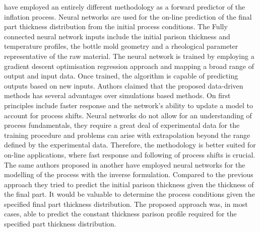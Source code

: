 \citep{diraddo1993line} have employed an entirely different methodology as a forward predictor of the inflation process. Neural networks are used for the on-line prediction of the final part thickness distribution from the initial process conditions. The Fully connected neural network inputs include the initial parison thickness and temperature profiles, the bottle mold geometry and a rheological parameter representative of the raw material. The neural network is trained by employing a gradient descent optimisation regression approach and mapping a broad range of output and input data. Once trained, the algorithm is capable of predicting outputs based on new inputs. Authors claimed that the proposed data-driven methods has several advantages over simulations based methods. On first principles include faster response and the network’s ability to update a model to account for process shifts. Neural networks do not allow for an understanding of process fundamentals, they require a great deal of experimental data for the training procedure and problems can arise with extrapolation beyond the range defined by the experimental
data. Therefore, the methodology is better suited for on-line applications, where fast response and following of process shifts is crucial. The same authors proposed in \citep{diraddo1993modeling} another have employed neural networks for the modelling of the process with the inverse formulation. Compared to the previous approach they tried to predict the initial parison thickness given the thickness of the final part. It would be valuable to determine the process conditions given the specified final part thickness distribution. The proposed approach was, in most cases, able to predict the constant thickness parison profile required for the specified part thickness distribution.   

